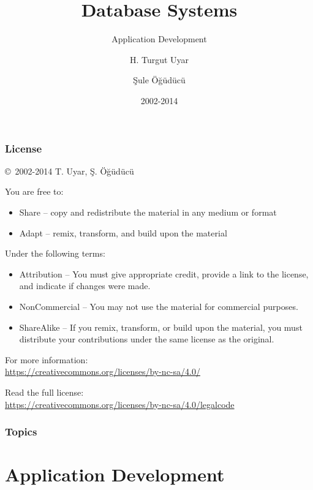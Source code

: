 \documentclass[dvipsnames]{beamer}
\title{Database Systems}
\subtitle{Application Development}
\author{H. Turgut Uyar \and Şule Öğüdücü}
\date{2002-2014}
\theoremstyle{plain}
\begin{document}
\begin{frame}
  \titlepage
\end{frame}

\begin{frame}
  \frametitle{License}

  \hfill
  \copyright~2002-2014 T. Uyar, Ş. Öğüdücü

  \vfill
  \begin{footnotesize}
    You are free to:
    \begin{itemize}
      \itemsep0em
      \item Share -- copy and redistribute the material in any medium or format
      \item Adapt -- remix, transform, and build upon the material
    \end{itemize}

    Under the following terms:
    \begin{itemize}
      \itemsep0em
      \item Attribution -- You must give appropriate credit, provide a link to
        the license, and indicate if changes were made.

      \item NonCommercial -- You may not use the material for commercial
        purposes.

      \item ShareAlike -- If you remix, transform, or build upon the material,
        you must distribute your contributions under the same license as the
        original.
    \end{itemize}
  \end{footnotesize}

  \begin{small}
    For more information:\\
    \url{https://creativecommons.org/licenses/by-nc-sa/4.0/}

    \smallskip
    Read the full license:\\
    \url{https://creativecommons.org/licenses/by-nc-sa/4.0/legalcode}
  \end{small}
\end{frame}

\begin{frame}
  \frametitle{Topics}
  \tableofcontents
\end{frame}

\section{Application Development}
\end{document}
